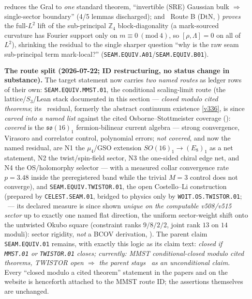reduces the Gral to \emph{one} standard theorem, ``invertible (SRE) Gaussian bulk $\Rightarrow$ single-sector
boundary'' (4/5 lemmas discharged); and \mE\ Route B (DtN, )
\emph{proves} the full-$L^2$ lift of the sub-principal $\mathbb{Z}_4$ block-diagonality (a mark-sourced curvature
has Fourier support only on $m\equiv0\ (\mathrm{mod}\ 4)$, so $[\rho,\Lambda]{=}0$ on all of $L^2$), shrinking the
residual to the single sharper question ``why is the raw seam sub-principal term mark-local?''
(\texttt{SEAM.EQUIV.A01}/\texttt{SEAM.EQUIV.B01}).
\par\smallskip\noindent\textbf{The route split (2026-07-22; ID restructuring, no status change in
substance).} The target statement now carries \emph{two named routes} as ledger rows of their own:
\texttt{SEAM.EQUIV.MMST.01}, the conditional scaling-limit route (the lattice/$S_3$/Lean stack
documented in this section --- \emph{closed modulo cited theorems}; its \mO\ residual, formerly the
abstract continuum existence \vref{v336}, is since \emph{carved into a named list} against the
cited Osborne--Stottmeister coverage (): \emph{covered} is
the $\mathfrak{so}(16)_1$ fermion-bilinear current algebra --- strong convergence, Virasoro and
correlator control, polynomial errors; \emph{not covered}, and now the named residual, are
N1 the $\mu_4$/GSO extension $SO(16)_1\to(E_8)_1$ as a net statement, N2 the twist/spin-field
sector, N3 the one-sided chiral edge net, and N4 the OS/holomorphy selector --- with a measured
collar convergence rate $p=3.48$ inside the preregistered band while the trivial $M{=}3$ control
does not converge), and \texttt{SEAM.EQUIV.TWISTOR.01}, the open
Costello--Li construction (prepared by \texttt{CELEST.SEAM.01}, bridged to physics only by
\texttt{WOIT.OS.TWISTOR.01}; \mO\ --- its declared measure is since shown \emph{unique on the
computable v508/v515 sector} up to exactly one named flat direction, the uniform sector-weight
shift onto the untwisted Okubo square (constraint ranks $9/8/2/2$, joint rank $13$ on $14$
moduli): sector rigidity, \emph{not} a BCOV derivation,
). The parent claim \texttt{SEAM.EQUIV.01} remains, with exactly this
logic as its claim text: \emph{closed if \texttt{MMST.01} or \texttt{TWISTOR.01} closes; currently:
MMST conditional-closed modulo cited theorems, TWISTOR open $\Rightarrow$ the parent stays \mO\ as an
unconditional claim.} Every ``closed modulo a cited theorem'' statement in the papers and on the
website is henceforth attached to the MMST route ID; the assertions themselves are unchanged.
